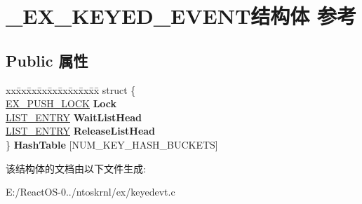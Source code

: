 \hypertarget{struct___e_x___k_e_y_e_d___e_v_e_n_t}{}\section{\+\_\+\+E\+X\+\_\+\+K\+E\+Y\+E\+D\+\_\+\+E\+V\+E\+N\+T结构体 参考}
\label{struct___e_x___k_e_y_e_d___e_v_e_n_t}
\subsection*{Public 属性}
\begin{DoxyCompactItemize}
\item 
\mbox{\label{struct___e_x___k_e_y_e_d___e_v_e_n_t_a7a86fd97ac5e46b05c61f03d4235c6ea}} 
\begin{tabbing}
xx\=xx\=xx\=xx\=xx\=xx\=xx\=xx\=xx\=\kill
struct \{\\
\>\hyperlink{struct___e_x___p_u_s_h___l_o_c_k}{EX\_PUSH\_LOCK} {\bfseries Lock}\\
\>\hyperlink{struct___l_i_s_t___e_n_t_r_y}{LIST\_ENTRY} {\bfseries WaitListHead}\\
\>\hyperlink{struct___l_i_s_t___e_n_t_r_y}{LIST\_ENTRY} {\bfseries ReleaseListHead}\\
\} {\bfseries HashTable} \mbox{[}NUM\_KEY\_HASH\_BUCKETS\mbox{]}\\

\end{tabbing}\end{DoxyCompactItemize}


该结构体的文档由以下文件生成\+:\begin{DoxyCompactItemize}
\item 
E\+:/\+React\+O\+S-\/0../ntoskrnl/ex/keyedevt.\+c\end{DoxyCompactItemize}

